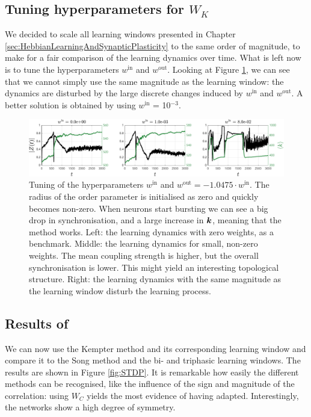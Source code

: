 \subsection{Tuning hyperparameters for \texorpdfstring{$W_K$}{TEXT}}
We decided to scale all learning windows presented in Chapter \ref{sec:HebbianLearningAndSynapticPlasticity} to the same order of magnitude, to make for a fair comparison of the learning dynamics over time. What is left now is to tune the hyperparameters $w^{\mathrm{in}}$ and $w^{\mathrm{out}}$. Looking at Figure \ref{fig:KempterWinWout}, we can see that we cannot simply use the same magnitude as the learning window: the dynamics are disturbed by the large discrete changes induced by $w^{\mathrm{in}}$ and $w^{\mathrm{out}}$. A better solution is obtained by using $w^{\mathrm{in}}$ = 10$^{-3}$.

\begin{figure}[H]
\centering
\includegraphics[width = \textwidth]{../Figures/Learning/KempterWinWout.pdf}
\caption{Tuning of the hyperparameters $w^{\mathrm{in}}$ and $w^{\mathrm{out}} = -1.0475 \cdot w^{\mathrm{in}}$. The radius of the order parameter is initialised as zero and quickly becomes non-zero. When neurons start bursting we can see a big drop in synchronisation, and a large increase in ${\boldsymbol{k}}$, meaning that the \STDP method works. Left: the learning dynamics with zero weights, as a benchmark. Middle: the learning dynamics for small, non-zero weights. The mean coupling strength is higher, but the overall synchronisation is lower. This might yield an interesting topological structure. Right: the learning dynamics with the same magnitude as the learning window disturb the learning process.}
\label{fig:KempterWinWout}
\end{figure}


\subsection{Results of \STDP} %
We can now use the Kempter method and its corresponding learning window and compare it to the Song method and the bi- and triphasic learning windows. The results are shown in Figure \ref{fig:STDP}. It is remarkable how easily the different methods can be recognised, like the influence of the sign and magnitude of the correlation: using $W_C$ yields the most evidence of having adapted. Interestingly, the networks show a high degree of symmetry. \\

